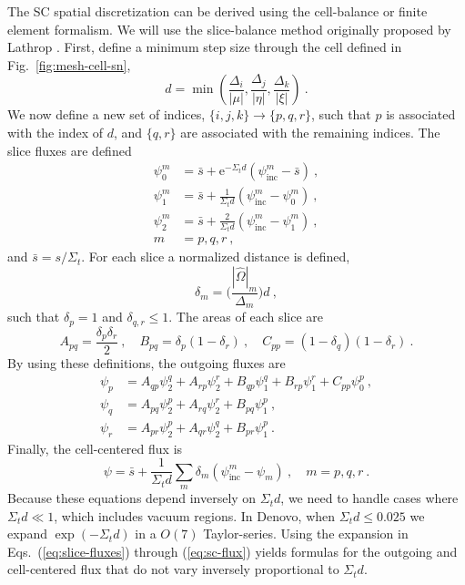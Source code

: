 \documentclass[12pt]{article}
\newcommand{\vOmega}{\ensuremath{\hat{\Omega}}}
\newcommand{\Di}{\ensuremath{\Delta_i}}
\newcommand{\Dj}{\ensuremath{\Delta_j}}
\newcommand{\Dk}{\ensuremath{\Delta_k}}
\begin{document}
The SC spatial discretization can be derived using the cell-balance or finite
element formalism.  We will use the slice-balance method originally proposed
by Lathrop \cite{lathrop_1969}.  First, define a minimum step size through the
cell defined in Fig.~\ref{fig:mesh-cell-sn},
\begin{equation}
  d = \min\left(\frac{\Di}{|\mu|}, \frac{\Dj}{|\eta|},
    \frac{\Dk}{|\xi|}\right)\:.
\end{equation}
We now define a new set of indices, $\{i,j,k\}\rightarrow\{p,q,r\}$, such that
$p$ is associated with the index of $d$,
and $\{q,r\}$ are associated with the remaining indices.  The slice fluxes are
defined
\begin{equation}
  \begin{aligned}
    \psi^m_0 &= \bar{s} + \text{e}^{-\Sigma_t d}(\psi^m_{\text{inc}} -
    \bar{s})\:,\\ \psi^m_1 &= \bar{s} + \frac{1}{\Sigma_t d}(\psi^m_{\text{inc}}
    - \psi^m_0)\:,\\ \psi^m_2 &= \bar{s} + \frac{2}{\Sigma_t
      d}(\psi^m_{\text{inc}} - \psi^m_1)\:,\\ m &= p,q,r\:,
  \end{aligned}
  \label{eq:slice-fluxes}
\end{equation}
and $\bar{s} = s/\Sigma_t$.  For each slice a normalized distance is defined,
\begin{equation}
  \delta_m = \biggl(\frac{|\vOmega|_m}{\Delta_m}\biggr)d\:,
\end{equation}
such that $\delta_p = 1$ and $\delta_{q,r}\le 1$.  The areas of each slice are
\begin{equation}
  A_{pq} = \frac{\delta_p\delta_r}{2}\:,\quad B_{pq} =
  \delta_p(1-\delta_r)\:,\quad C_{pp} = (1-\delta_q)(1-\delta_r)\:.
\end{equation}
By using these definitions, the outgoing fluxes are
\begin{equation}
  \begin{aligned}
    \psi_p &= A_{qp}\psi_2^q + A_{rp}\psi_2^r + B_{qp}\psi_1^q +
    B_{rp}\psi_1^r + C_{pp}\psi_0^p\:,\\
    \psi_q &= A_{pq}\psi_2^p + A_{rq}\psi_2^r + B_{pq}\psi_1^p\:,\\
    \psi_r &= A_{pr}\psi_2^p + A_{qr}\psi_2^q + B_{pr}\psi_1^p\:.
  \end{aligned}
\end{equation}
Finally, the cell-centered flux is
\begin{equation}
  \psi = \bar{s} + \frac{1}{\Sigma_t
    d}\sum_{m}\delta_m(\psi_\text{inc}^m - \psi_m)\:,\quad m=p,q,r\:.
  \label{eq:sc-flux}
\end{equation}
Because these equations depend inversely on $\Sigma_t d$, we need to handle
cases where $\Sigma_t d \ll 1$, which includes vacuum regions.  In Denovo,
when $\Sigma_t d \le 0.025$ we expand $\exp(-\Sigma_t d)$ in a $O(7)$
Taylor-series.  Using the expansion in Eqs.~(\ref{eq:slice-fluxes}) through
(\ref{eq:sc-flux}) yields formulas for the outgoing and cell-centered flux
that do not vary inversely proportional to $\Sigma_t d$.
\end{document}
